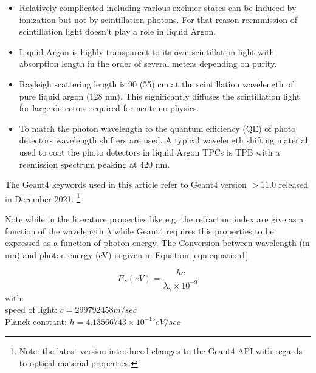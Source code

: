 \documentclass{article}
\begin{document}
\begin{itemize}
\item Relatively complicated including various excimer states can be induced by ionization but not by scintillation photons. For that reason reemmission of scintillation light doesn't play a role in liquid Argon.
  
\item Liquid Argon is highly transparent to its own scintillation light with absorption length in the order of several meters depending on purity.

\item Rayleigh scattering length is 90 (55) cm at the scintillation wavelength of pure liquid argon (128 nm). This significantly diffuses the scintillation light for large detectors required for neutrino physics. 
\item To match the photon wavelength to the quantum efficiency (QE) of photo detectors wavelength shifters are used. A typical wavelength shifting material used to coat the photo detectors in liquid
Argon TPCs is TPB with a reemission spectrum peaking at 420 nm. 
\end{itemize}

The Geant4 keywords used in this article refer to Geant4 version $ > 11.0$ released in December 2021.
\footnote{Note: the latest version introduced changes to the Geant4 API with regards to optical material properties.} 

Note while in the literature properties like e.g. the refraction index are give as a function of the wavelength $\lambda$ while Geant4 requires this properties to be expressed as a function of photon energy.
 The Conversion between wavelength (in nm) and photon energy (eV) is given in Equation \ref{equ:equation1}

\begin{equation}
  E_{\gamma}(eV) = \frac{h  c}{\lambda_{\gamma} \times  10^{-9}}
  \label{equ:equation1}
\end{equation}
\noindent
    with:\\
  speed of light: $c = 299792458 m/sec$\\
  Planck constant: $h = 4.13566743\times10^{-15} eV/sec$\\
  \clearpage
\end{document}
